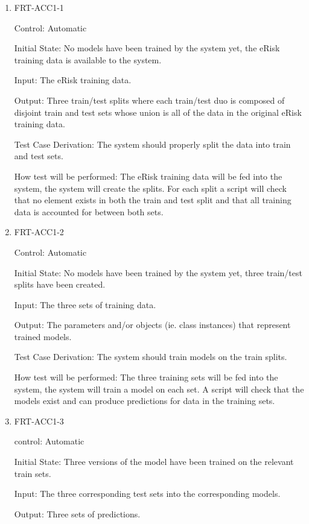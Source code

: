 \documentclass[12pt, titlepage]{article}
\begin{document}
\begin{enumerate}

\item{FRT-ACC1-1\\}

Control: Automatic

Initial State: No models have been trained by the system yet, the eRisk training data is available to the system.

Input: The eRisk training data.

Output: Three train/test splits where each train/test duo is composed of disjoint train and test sets whose union is all of the data in the original eRisk training data.

Test Case Derivation: The system should properly split the data into train and test sets.

How test will be performed: The eRisk training data will be fed into the system, the system will create the splits. For each split a script will check that no element exists in both the train and test split and that all training data is accounted for between both sets.

\item{FRT-ACC1-2\\}

Control: Automatic

Initial State: No models have been trained by the system yet, three train/test splits have been created.

Input: The three sets of training data.

Output: The parameters and/or objects (ie. class instances) that represent trained models.

Test Case Derivation: The system should train models on the train splits.

How test will be performed: The three training sets will be fed into the system, the system will train a model on each set. A script will check that the models exist and can produce predictions for data in the training sets.

\item{FRT-ACC1-3\\}

control: Automatic

Initial State: Three versions of the model have been trained on the relevant train sets.

Input: The three corresponding test sets into the corresponding models.

Output: Three sets of predictions.


\end{enumerate}
\end{document}
